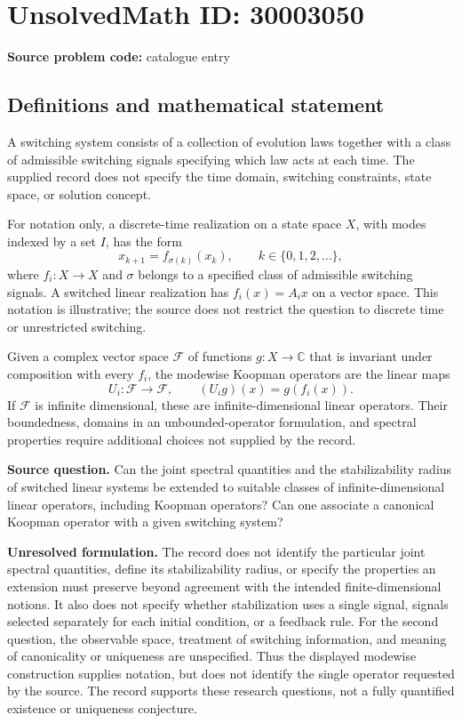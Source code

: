 \documentclass[11pt]{article}
\newcommand{\C}{\mathbb{C}}
\begin{document}
\section*{UnsolvedMath ID: 30003050}
\textbf{Source problem code:} catalogue entry
\subsection{Definitions and mathematical statement}
A switching system consists of a collection of evolution laws together with a class of admissible switching signals specifying which law acts at each time. The supplied record does not specify the time domain, switching constraints, state space, or solution concept.

For notation only, a discrete-time realization on a state space \(X\), with modes indexed by a set \(I\), has the form
\[
 x_{k+1}=f_{\sigma(k)}(x_k),\qquad k\in\{0,1,2,\ldots\},
\]
where \(f_i:X\to X\) and \(\sigma\) belongs to a specified class of admissible switching signals. A switched linear realization has \(f_i(x)=A_i x\) on a vector space. This notation is illustrative; the source does not restrict the question to discrete time or unrestricted switching.

Given a complex vector space \(\mathcal F\) of functions \(g:X\to\C\) that is invariant under composition with every \(f_i\), the modewise Koopman operators are the linear maps
\[
 U_i:\mathcal F\to\mathcal F,\qquad (U_i g)(x)=g(f_i(x)).
\]
If \(\mathcal F\) is infinite dimensional, these are infinite-dimensional linear operators. Their boundedness, domains in an unbounded-operator formulation, and spectral properties require additional choices not supplied by the record.

\textbf{Source question.} Can the joint spectral quantities and the stabilizability radius of switched linear systems be extended to suitable classes of infinite-dimensional linear operators, including Koopman operators? Can one associate a canonical Koopman operator with a given switching system?

\textbf{Unresolved formulation.} The record does not identify the particular joint spectral quantities, define its stabilizability radius, or specify the properties an extension must preserve beyond agreement with the intended finite-dimensional notions. It also does not specify whether stabilization uses a single signal, signals selected separately for each initial condition, or a feedback rule. For the second question, the observable space, treatment of switching information, and meaning of canonicality or uniqueness are unspecified. Thus the displayed modewise construction supplies notation, but does not identify the single operator requested by the source. The record supports these research questions, not a fully quantified existence or uniqueness conjecture.
\end{document}

